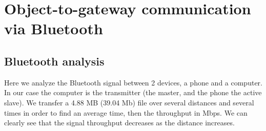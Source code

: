 \documentclass[12]{article}
\begin{document}
\newpage
\section{Object-to-gateway communication via Bluetooth}



\subsection{Bluetooth analysis}

Here we analyze the Bluetooth signal between 2 devices, a phone and a computer. In our case the computer is the transmitter (the master, and the phone the active slave). We transfer a 4.88 MB (39.04 Mb) file over several distances and several times in order to find an average time, then the throughput in Mbps. We can clearly see that the signal throughput decreases as the distance increases.
\end{document}
